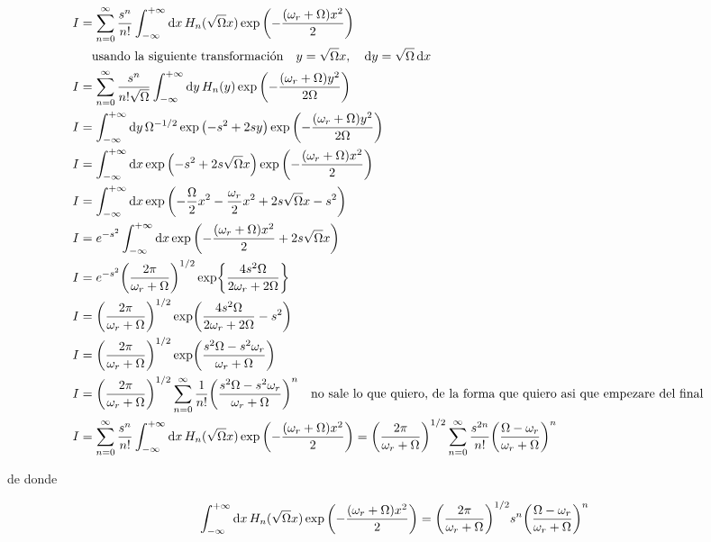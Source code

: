\documentclass[../Main.tex]{subfiles}
\begin{document}
\begin{equation}
\begin{split}
I & = \sum_{n=0}^{\infty}\dfrac{s^n}{n!}\int_{-\infty}^{+\infty}\dd{x}H_n(\sqrt{\Omega} x)\exp \pqty{- \frac{\pqty{\omega_{r}+\Omega} x^2}{2}} \\ 
& \qq{usando la siguiente transformación} y=\sqrt{\Omega}x \qc\dd{y}=\sqrt{\Omega}\dd{x} \\
I & = \sum_{n=0}^{\infty}\dfrac{s^n}{n!\sqrt{\Omega}}\int_{-\infty}^{+\infty}\dd{y}H_n(y)\exp \pqty{- \frac{\pqty{\omega_{r}+\Omega} y^2}{2\Omega}} \\
I & =\int_{-\infty}^{+\infty}\dd{y}\Omega^{-1/2}\exp \pqty{-s^2+2sy} \exp \pqty{- \frac{\pqty{\omega_{r}+\Omega} y^2}{2\Omega}}\\ %
I & =\int_{-\infty}^{+\infty}\dd{x}\exp \pqty{-s^2+2s\sqrt{\Omega} x} \exp \pqty{- \frac{\pqty{\omega_{r}+\Omega} x^2}{2}}\\
I & =\int_{-\infty}^{+\infty}\dd{x}\exp \pqty{- \frac{\Omega }{2}x^2-\dfrac{\omega_{r}}{2}x^2+2s\sqrt{\Omega} x-s^2}\\
I & =e^{-s^2}\int_{-\infty}^{+\infty}\dd{x}\exp \pqty{- \frac{\pqty{\omega_{r}+\Omega} x^2}{2}+2s\sqrt{\Omega} x}\\
I & =e^{-s^2}\pqty{\dfrac{2\pi}{\omega_{r}+\Omega}}^{1/2}\exp{\dfrac{4s^2\Omega}{2\omega_{r}+2\Omega}}\\
I & =\pqty{\dfrac{2\pi}{\omega_{r}+\Omega}}^{1/2}\exp(\dfrac{4s^2\Omega}{2\omega_{r}+2\Omega}-s^2)\\
I & =\pqty{\dfrac{2\pi}{\omega_{r}+\Omega}}^{1/2}\exp(\dfrac{s^2\Omega-s^2\omega_{r}}{\omega_{r}+\Omega})\\
I & =\pqty{\dfrac{2\pi}{\omega_{r}+\Omega}}^{1/2} \sum_{n=0}^{\infty}\dfrac{1}{n!}\pqty{\dfrac{s^2\Omega-s^2\omega_{r}}{\omega_{r}+\Omega}}^n \qq{no sale lo que quiero, de la forma que quiero asi que empezare del final}\\
I & =\sum_{n=0}^{\infty}\dfrac{s^n}{n!}\int_{-\infty}^{+\infty}\dd{x}H_n(\sqrt{\Omega} x)\exp \pqty{- \frac{\pqty{\omega_{r}+\Omega} x^2}{2}} =\pqty{\dfrac{2\pi}{\omega_{r}+\Omega}}^{1/2} \sum_{n=0}^{\infty}\dfrac{s^{2n}}{n!}\pqty{\dfrac{\Omega-\omega_{r}}{\omega_{r}+\Omega}}^n
\end{split}
\end{equation}

de donde

\begin{equation}
\int_{-\infty}^{+\infty}\dd{x}H_n(\sqrt{\Omega} x)\exp \pqty{- \frac{\pqty{\omega_{r}+\Omega} x^2}{2}} =\pqty{\dfrac{2\pi}{\omega_{r}+\Omega}}^{1/2}s^n\pqty{\dfrac{\Omega-\omega_{r}}{\omega_{r}+\Omega}}^n
\end{equation}
\end{document}
